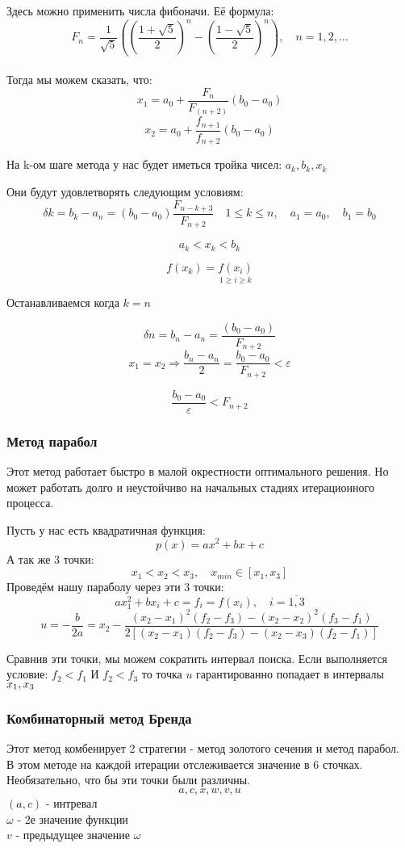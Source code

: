 \documentclass[fleqn]{article}
\begin{document}
Здесь можно применить числа фибоначи. Её формула:
$$F_n = \frac{1}{\sqrt{5}}((\frac{1+\sqrt{5}}{2})^n-(\frac{1-\sqrt{5}}{2})^n),\quad n=1,2,\dots$$\\

Тогда мы можем сказать, что:\\

$$x_1=a_0+\frac{F_n}{F_(n+2)}(b_0-a_0)$$
$$x_2=a_0+\frac{f_{n+1}}{f_{n+2}}(b_0-a_0)$$

На k-ом шаге метода у нас будет иметься тройка чисел: $a_k, b_k, x_k$

Они будут удовлетворять следующим условиям:
$$\delta k = b_k - a_n = (b_0-a_0)\frac{F_{n-k+3}}{F_{n+2}} \quad 1 \leq k \leq n,\quad a_1 = a_0,\quad b_1=b_0$$

$$a_k < x_k < b_k$$

$$f(x_k)=\underset{1 \geq i \geq k}{f(x_i)}$$

Останавливаемся когда $k=n$

$$\delta n = b_n - a_n = \frac{(b_0-a_0)}{F_{n+2}}$$
$$x_1 = x_2 \Rightarrow \frac{b_n - a_n}{2} = \frac{b_0-a_0}{F_{n+2}}<\varepsilon$$

$$\frac{b_0-a_0}{\varepsilon}<F_{n+2}$$

\subsubsection*{Метод парабол}
Этот метод работает быстро в малой окрестности оптимального решения. Но может работать долго и неустойчиво на начальных стадиях итерационного процесса.

Пусть у нас есть квадратичная функция:
$$p(x)=ax^2+bx+c$$
А так же 3 точки:
$$x_1 < x_2 < x_3,\quad x_{min}\in[x_1,x_3]$$
Проведём нашу параболу через эти 3 точки:
$$ax^2_1+bx_i+c=f_i=f(x_i),\quad i=\overline{1,3}$$
$$u=-\frac{b}{2a}=x_2-\frac{(x_2-x_1)^2(f_2-f_3)-(x_2-x_2)^2(f_3-f_1)}{2[(x_2-x_1)(f_2-f_3)-(x_2-x_3)(f_2-f_1)]}$$

Сравнив эти точки, мы можем сократить интервал поиска. Если выполняется условие: $f_2<f_1$ И $f_2<f_3$ то точка $u$ гарантированно попадает в интервалы $x_1,\space x_3$

\subsubsection*{Комбинаторный метод Бренда}
Этот метод комбенирует 2 стратегии - метод золотого сечения и метод парабол.\\

В этом методе на каждой итерации отслеживается значение в 6 сточках. Необязательно, что бы эти точки были различны.
$$a, c, x, w, v, u$$
$(a,c)$ - интревал\\
$\omega$ - 2е значение функции\\
$v$ - предыдущее значение $\omega$\\
\end{document}
